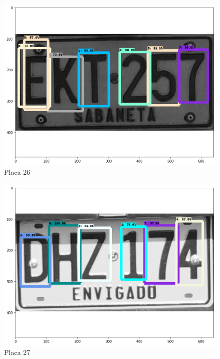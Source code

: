 
\begin{figure}[H]
\centering
\includegraphics[width=0.4\linewidth]{imagenes/caracteres detectados/nuevo entrenamiento/11.png}
\caption{Placa 26}
\label{fig:caracteres detectados p31}
\end{figure}

\begin{table}[H]
    \centering
    \caption{Detección de caracteres con porcentajes de acierto placa 26}
    \label{tab:p31}
\end{table}


\begin{figure}[H]
\centering
\includegraphics[width=0.4\linewidth]{imagenes/caracteres detectados/nuevo entrenamiento/32.png}
\caption{Placa 27}
\label{fig:caracteres detectados p28}
\end{figure}

